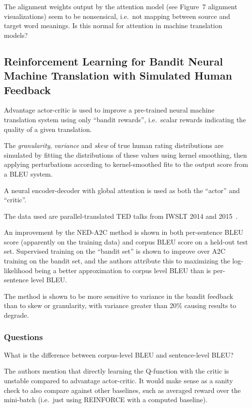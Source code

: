 \documentclass[a4paper, 12pt]{article}
\begin{document}
The alignment weights output by the attention model (see Figure~7 alignment
visualizations) seem to be nonsensical, i.e.\ not mapping between source and
target word meanings. Is this normal for attention in machine translation
models?


\subsection{Reinforcement Learning for Bandit Neural Machine Translation with
            Simulated Human Feedback~\citet{DBLP:journals/corr/NguyenDB17}}

Advantage actor-critic is used to improve a pre-trained neural machine
translation system using only ``bandit rewards'', i.e.\ scalar rewards
indicating the quality of a given translation.

The \emph{granularity}, \emph{variance} and \emph{skew} of true human rating
distributions are simulated by fitting the distributions of these values using
kernel smoothing, then applying perturbations according to kernel-smoothed fits
to the output score from a BLEU system.

A neural encoder-decoder with global attention is used as both the ``actor''
and ``critic''.

The data used are parallel-translated TED talks from IWSLT 2014 and
2015~\citet{cettolo2015iwslt}.

An improvement by the NED-A2C method is shown in both per-sentence BLEU score
(apparently on the training data) and corpus BLEU score on a held-out test set.
Supervised training on the ``bandit set'' is shown to improve over A2C training
on the bandit set, and the authors attribute this to maximizing the
log-likelihood being a better approximation to corpus level BLEU than is
per-sentence level BLEU\@.

The method is shown to be more sensitive to variance in the bandit feedback
than to skew or granularity, with variance greater than 20\% causing results to
degrade.


\subsubsection{Questions}

What is the difference between corpus-level BLEU and sentence-level BLEU\@?

The authors mention that directly learning the Q-function with the critic is
unstable compared to advantage actor-critic. It would make sense as a sanity
check to also compare against other baselines, such as averaged reward over the
mini-batch (i.e.\ just using REINFORCE with a computed baseline).
\end{document}
